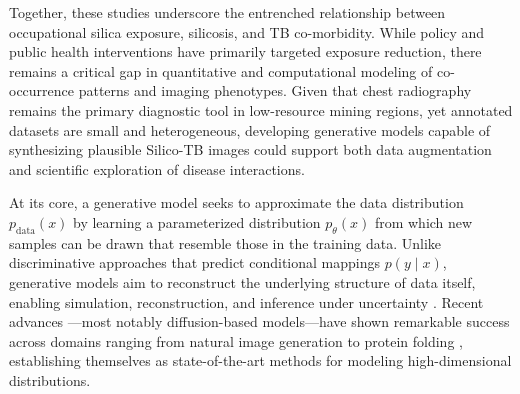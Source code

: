 Together, these studies underscore the entrenched relationship between occupational silica exposure, silicosis, and TB co-morbidity.
While policy and public health interventions have primarily targeted exposure reduction, there remains a critical gap in quantitative and computational modeling of co-occurrence patterns and imaging phenotypes. 
Given that chest radiography remains the primary diagnostic tool in low-resource mining regions, yet annotated datasets are small and heterogeneous, developing generative models capable of synthesizing plausible Silico-TB images could support both data augmentation and scientific exploration of disease interactions.


At its core, a generative model seeks to approximate the data distribution \(p_{\text{data}}(x)\) by learning a parameterized distribution \(p_\theta(x)\) from which new samples can be drawn that resemble those in the training data.  
Unlike discriminative approaches that predict conditional mappings \(p(y \mid x)\), generative models aim to reconstruct the underlying structure of data itself, enabling simulation, reconstruction, and inference under uncertainty \citep{bond2021deep,tomczak2024deep}.  
Recent advances \citep{rombach2022high, pmlr-v139-nichol21a, 2022arXiv220406125R} —most notably diffusion-based models—have shown remarkable success across domains ranging from natural image generation \citep{rombach2022high} to protein folding \citep{wu2024protein, skreta2024superposition}, establishing themselves as state-of-the-art methods for modeling high-dimensional distributions.

